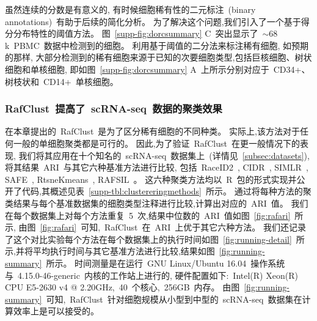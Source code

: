 虽然连续的分数是有意义的,
有时候细胞稀有性的二元标注~(binary annotations)~有助于后续的简化分析。
为了解决这个问题,我们引入了一个基于得分分布特性的阈值方法。
图~\ref{supp-fig:dorcsummary} C~突出显示了~${\sim}68$k~PBMC~数据中检测到的细胞。
利用基于阈值的二分法来标注稀有细胞,
如预期的那样,
大部分检测到的稀有细胞来源于已知的次要细胞类型,包括巨核细胞、树状细胞和单核细胞,
即如图~\ref{supp-fig:dorcsummary} A~上所示分别对应于~CD34+、树枝状和~CD14+~单核细胞。

\subsubsection{RafClust~提高了~scRNA-seq~数据的聚类效果}

在本章提出的~RafClust~是为了区分稀有细胞的不同种类。
实际上,该方法对于任何一般的单细胞聚类都是可行的。
因此,为了验证~RafClust~在更一般情况下的表现,
我们将其应用在十个知名的~scRNA-seq~数据集上~(详情见~\ref{subsec:datasets}),
将其结果~ARI~与其它六种基准方法进行比较,
包括~RaceID2~\cite{grun2016novo}, CIDR~\cite{lin2017cidr}, SIMLR~\cite{wang2018simlr}, SAFE~\cite{yang2018safe}, RtsneKmeans~\cite{hartigan1979algorithm,maaten2008visualizing,van2014accelerating}, RAFSIL~\cite{pouyan2018random}。
这六种聚类方法均以~R~包的形式实现并公开了代码,其概述见表~\ref{supp-tbl:clustereringmethods}~所示。
通过将每种方法的聚类结果与每个基准数据集的细胞类型注释进行比较,计算出对应的~ARI~值。 
我们在每个数据集上对每个方法重复~5~次,结果中位数的~ARI~值如图~\ref{fig:rafari}~所示,
由图~\ref{fig:rafari}~可知,~RafClust~在~ARI~上优于其它六种方法。
我们还记录了这个对比实验每个方法在每个数据集上的执行时间如图~\ref{fig:running-detail}~所示,并将平均执行时间与其它基准方法进行比较,结果如图~\ref{fig:running-summary}~所示。
时间测量是在运行~GNU Linux/Ubuntu 16.04~操作系统与~4.15.0-46-generic~内核的工作站上进行的,
硬件配置如下:~Intel(R) Xeon(R) CPU E5-2630 v4 @ 2.20GHz,~40~个核心,~256GB~内存。
由图~\ref{fig:running-summary}~可知,~RafClust~针对细胞规模从小型到中型的~scRNA-seq~数据集在计算效率上是可以接受的。

